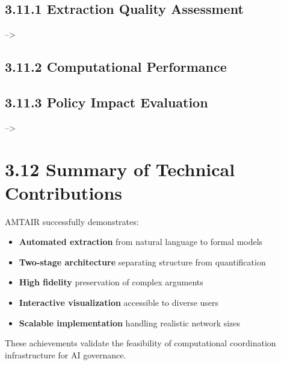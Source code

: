 \documentclass[
  11pt,
  letterpaper,
]{book}
\providecommand{\tightlist}{%
  \setlength{\itemsep}{0pt}\setlength{\parskip}{0pt}}
\begin{document}

\subsection*{3.11.1 Extraction Quality
Assessment}\label{sec-extraction-quality}

--\textgreater{}

\subsection*{3.11.2 Computational
Performance}\label{sec-computational-performance}

\subsection*{3.11.3 Policy Impact Evaluation}\label{sec-policy-impact}

--\textgreater{}

\section*{3.12 Summary of Technical
Contributions}\label{sec-technical-summary}


AMTAIR successfully demonstrates:

\begin{itemize}
\tightlist
\item
  \textbf{Automated extraction} from natural language to formal models
\item
  \textbf{Two-stage architecture} separating structure from
  quantification
\item
  \textbf{High fidelity} preservation of complex arguments
\item
  \textbf{Interactive visualization} accessible to diverse users
\item
  \textbf{Scalable implementation} handling realistic network sizes
\end{itemize}

These achievements validate the feasibility of computational
coordination infrastructure for AI governance.
\end{document}

